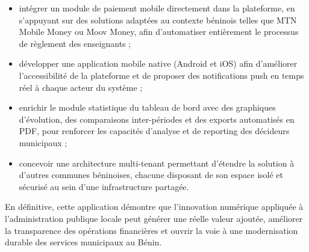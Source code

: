 \begin{itemize}
    \item intégrer un module de paiement mobile directement dans
    la plateforme, en s'appuyant sur des solutions adaptées
    au contexte béninois telles que MTN Mobile Money ou Moov Money,
    afin d'automatiser entièrement le processus de règlement
    des enseignants ;

    \item développer une application mobile native (Android et iOS)
    afin d'améliorer l'accessibilité de la plateforme et de
    proposer des notifications push en temps réel à chaque acteur
    du système ;

    \item enrichir le module statistique du tableau de bord
    avec des graphiques d'évolution, des comparaisons inter-périodes
    et des exports automatisés en PDF, pour renforcer les capacités
    d'analyse et de reporting des décideurs municipaux ;

    \item concevoir une architecture multi-tenant permettant
    d'étendre la solution à d'autres communes béninoises, chacune
    disposant de son espace isolé et sécurisé au sein d'une
    infrastructure partagée.
\end{itemize}

En définitive, cette application démontre que l'innovation numérique
appliquée à l'administration publique locale peut générer une réelle
valeur ajoutée, améliorer la transparence des opérations financières
et ouvrir la voie à une modernisation durable des services municipaux
au Bénin.